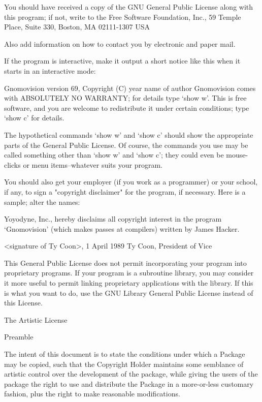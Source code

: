 \documentclass{doc}
\begin{document}
    You should have received a copy of the GNU General Public License
    along with this program; if not, write to the Free Software
    Foundation, Inc., 59 Temple Place, Suite 330, Boston, MA  02111-1307  USA


Also add information on how to contact you by electronic and paper mail.

If the program is interactive, make it output a short notice like this
when it starts in an interactive mode:

    Gnomovision version 69, Copyright (C) year name of author
    Gnomovision comes with ABSOLUTELY NO WARRANTY; for details type `show w'.
    This is free software, and you are welcome to redistribute it
    under certain conditions; type `show c' for details.

The hypothetical commands `show w' and `show c' should show the appropriate
parts of the General Public License.  Of course, the commands you use may
be called something other than `show w' and `show c'; they could even be
mouse-clicks or menu items--whatever suits your program.

You should also get your employer (if you work as a programmer) or your
school, if any, to sign a "copyright disclaimer" for the program, if
necessary.  Here is a sample; alter the names:

  Yoyodyne, Inc., hereby disclaims all copyright interest in the program
  `Gnomovision' (which makes passes at compilers) written by James Hacker.

  <signature of Ty Coon>, 1 April 1989
  Ty Coon, President of Vice

This General Public License does not permit incorporating your program into
proprietary programs.  If your program is a subroutine library, you may
consider it more useful to permit linking proprietary applications with the
library.  If this is what you want to do, use the GNU Library General
Public License instead of this License.



The Artistic License

Preamble

The intent of this document is to state the conditions under which a Package may be
copied, such that the Copyright Holder maintains some semblance of artistic control over
the development of the package, while giving the users of the package the right to use and
distribute the Package in a more-or-less customary fashion, plus the right to make
reasonable modifications.
\end{document}

